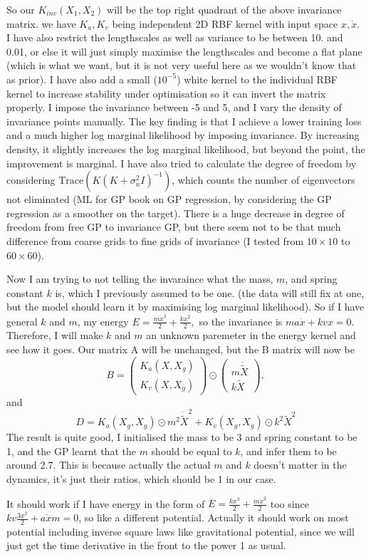 \documentclass{article}
\begin{document}
So our $K_{inv}(X_1, X_2)$ will be the top right quadrant of the above invariance matrix. 
we have $K_a, K_v$ being independent 2D RBF kernel with input space $x, \dot{x}.$
I have also restrict the lengthscales as well as variance to be between 10. and 0.01, or else it will just simply maximise the lengthscales and become a flat plane (which is what we want, but it is not very useful here as we wouldn't know that as prior).
I have also add a small ($10^{-5}$) white kernel to the individual RBF kernel to increase stability under optimisation so it can invert the matrix properly. 
I impose the invariance between -5 and 5, and I vary the density of invariance points manually. 
The key finding is that I achieve a lower training loss and a much higher log marginal likelihood by imposing invariance. 
By increasing density, it slightly increases the log marginal likelihood, but beyond the point, the improvement is marginal.
I have also tried to calculate the degree of freedom by considering $\mathrm{Trace}(K(K+\sigma^2_nI)^{-1})$, which counts the number of eigenvectors not eliminated (ML for GP book on GP regression, by considering the GP regression as a smoother on the target). 
There is a huge decrease in degree of freedom from free GP to invariance GP, but there seem not to be that much difference from coarse grids to fine grids of invariance (I tested from $10\times 10$ to $60\times 60$).

Now I am trying to not telling the invaraince what the mass, $m$, and spring constant $k$ is, which I previously assumed to be one. (the data will still fix at one, but the model should learn it by maximising log marginal likelihood).
So if I have general $k$ and $m$, my energy $E=\frac{m\dot{x}^2}{2}+\frac{kx^2}{2},$ so the invariance is $ma\dot{x}+kvx=0.$
Therefore, I will make $k$ and $m$ an unknown paremeter in the energy kernel and see how it goes.
Our matrix A will be unchanged, but the B matrix will now be
$$
B = \begin{pmatrix}
  K_a(X, X_g) \\ K_v(X, X_g) \end{pmatrix}
  \odot \begin{pmatrix}
    m\dot{\tilde{X}} \\ k\tilde{X}
  \end{pmatrix}, 
$$
and 
$$
D = K_a(X_g, X_g) \odot m^2\dot{\tilde{X}}^2 + K_v(X_g, X_g) \odot k^2\tilde{X}^2
$$
The result is quite good, I initialised the mass to be 3 and spring constant to be 1, and the GP learnt that the $m$ should be equal to $k$, and infer them to be around 2.7. 
This is because actually the actual $m$ and $k$ doesn't matter in the dynamics, it's just their ratios, which should be 1 in our case. 

It should work if I have energy in the form of $E=\frac{kx^3}{2}+\frac{m\dot{x}^2}{2}$ too since $kv\frac{3x^2}{2}+a\dot{x}m=0$, so like a different potential.
Actually it should work on most potential including inverse square laws like gravitational potential, since we will just get the time derivative in the front to the power 1 as usual.
\end{document}
